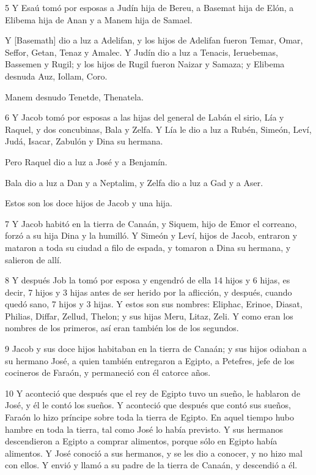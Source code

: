 \par 5 Y Esaú tomó por esposas a Judín hija de Bereu, a Basemat hija de Elón, a Elibema hija de Anan y a Manem hija de Samael.

\par Y [Basemath] dio a luz a Adelifan, y los hijos de Adelifan fueron Temar, Omar, Seffor, Getan, Tenaz y Amalec. Y Judín dio a luz a Tenacis, Ieruebemas, Bassemen y Rugil; y los hijos de Rugil fueron Naizar y Samaza; y Elibema desnuda Auz, Iollam, Coro.

\par Manem desnudo Tenetde, Thenatela.

\par 6 Y Jacob tomó por esposas a las hijas del general de Labán el sirio, Lía y Raquel, y dos concubinas, Bala y Zelfa. Y Lía le dio a luz a Rubén, Simeón, Leví, Judá, Isacar, Zabulón y Dina su hermana.

\par Pero Raquel dio a luz a José y a Benjamín.

\par Bala dio a luz a Dan y a Neptalim, y Zelfa dio a luz a Gad y a Aser.

\par Estos son los doce hijos de Jacob y una hija.

\par 7 Y Jacob habitó en la tierra de Canaán, y Siquem, hijo de Emor el correano, forzó a su hija Dina y la humilló. Y Simeón y Leví, hijos de Jacob, entraron y mataron a toda su ciudad a filo de espada, y tomaron a Dina su hermana, y salieron de allí.

\par 8 Y después Job la tomó por esposa y engendró de ella 14 hijos y 6 hijas, es decir, 7 hijos y 3 hijas antes de ser herido por la aflicción, y después, cuando quedó sano, 7 hijos y 3 hijas. Y estos son sus nombres: Eliphac, Erinoe, Diasat, Philias, Diffar, Zellud, Thelon; y sus hijas Meru, Litaz, Zeli. Y como eran los nombres de los primeros, así eran también los de los segundos.

\par 9 Jacob y sus doce hijos habitaban en la tierra de Canaán; y sus hijos odiaban a su hermano José, a quien también entregaron a Egipto, a Petefres, jefe de los cocineros de Faraón, y permaneció con él catorce años.

\par 10 Y aconteció que después que el rey de Egipto tuvo un sueño, le hablaron de José, y él le contó los sueños. Y aconteció que después que contó sus sueños, Faraón lo hizo príncipe sobre toda la tierra de Egipto. En aquel tiempo hubo hambre en toda la tierra, tal como José lo había previsto. Y sus hermanos descendieron a Egipto a comprar alimentos, porque sólo en Egipto había alimentos. Y José conoció a sus hermanos, y se les dio a conocer, y no hizo mal con ellos. Y envió y llamó a su padre de la tierra de Canaán, y descendió a él.

